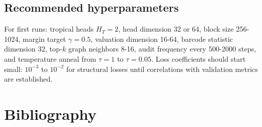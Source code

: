 \documentclass[11pt]{article}
\begin{document}
\subsection{Recommended hyperparameters}

For first runs: tropical heads \(H_T=2\), head dimension 32 or 64, block size 256-1024, margin target \(\gamma=0.5\), valuation dimension 16-64, barcode statistic dimension 32, top-\(k\) graph neighbors 8-16, audit frequency every 500-2000 steps, and temperature anneal from \(\tau=1\) to \(\tau=0.05\).  Loss coefficients should start small: \(10^{-3}\) to \(10^{-2}\) for structural losses until correlations with validation metrics are established.

\section{Bibliography}
\end{document}
